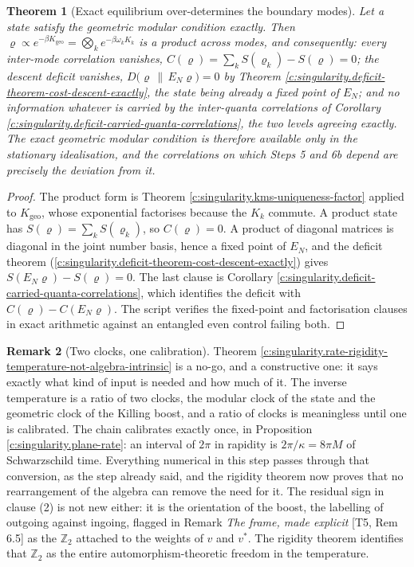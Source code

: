 \documentclass[11pt]{article}
\newtheorem{theorem}{Theorem}[section]
\theoremstyle{definition}
\newtheorem{remark}[theorem]{Remark}
\theoremstyle{plain}
\providecommand{\EN}{}\renewcommand{\EN}{E_{N}}
\providecommand{\rel}{}\renewcommand{\rel}[2]{D\bigl(#1 \,\|\, #2\bigr)}
\begin{document}
\begin{theorem}[Exact equilibrium over-determines the boundary modes]\label{c:singularity.exact-equilibrium-over-determines-boundary-modes}
Let a state satisfy the geometric modular condition exactly. Then $\varrho \propto e^{-\beta K_{\mathrm{geo}}} = \bigotimes_k e^{-\beta\omega_k K_k}$ is a product across modes, and consequently: every inter-mode correlation vanishes, $C(\varrho) = \sum_k S(\varrho_k) - S(\varrho) = 0$; the descent deficit vanishes, $\rel{\varrho}{\EN\varrho} = 0$ by Theorem \ref{c:singularity.deficit-theorem-cost-descent-exactly}, the state being already a fixed point of $\EN$; and no information whatever is carried by the inter-quanta correlations of Corollary \ref{c:singularity.deficit-carried-quanta-correlations}, the two levels agreeing exactly. The exact geometric modular condition is therefore available only in the stationary idealisation, and the correlations on which Steps 5 and 6b depend are precisely the deviation from it.
\end{theorem}
\begin{proof}
The product form is Theorem \ref{c:singularity.kms-uniqueness-factor} applied to $K_{\mathrm{geo}}$, whose exponential factorises because the $K_k$ commute. A product state has $S(\varrho) = \sum_k S(\varrho_k)$, so $C(\varrho) = 0$. A product of diagonal matrices is diagonal in the joint number basis, hence a fixed point of $\EN$, and the deficit theorem (\ref{c:singularity.deficit-theorem-cost-descent-exactly}) gives $S(\EN\varrho) - S(\varrho) = 0$. The last clause is Corollary \ref{c:singularity.deficit-carried-quanta-correlations}, which identifies the deficit with $C(\varrho) - C(\EN\varrho)$. The script verifies the fixed-point and factorisation clauses in exact arithmetic against an entangled even control failing both.

\end{proof}

\begin{remark}[Two clocks, one calibration]\label{c:note.singularity.two-clocks-one-calibration}
Theorem \ref{c:singularity.rate-rigidity-temperature-not-algebra-intrinsic} is a no-go, and a constructive one: it says exactly what kind of input is needed and how much of it. The inverse temperature is a ratio of two clocks, the modular clock of the state and the geometric clock of the Killing boost, and a ratio of clocks is meaningless until one is calibrated. The chain calibrates exactly once, in Proposition \ref{c:singularity.plane-rate}: an interval of $2\pi$ in rapidity is $2\pi/\kappa = 8\pi M$ of Schwarzschild time. Everything numerical in this step passes through that conversion, as the step already said, and the rigidity theorem now proves that no rearrangement of the algebra can remove the need for it. The residual sign in clause (2) is not new either: it is the orientation of the boost, the labelling of outgoing against ingoing, flagged in Remark \emph{The frame, made explicit} [T5, Rem 6.5] as the $\mathbb{Z}_2$ attached to the weights of $v$ and $v^{*}$. The rigidity theorem identifies that $\mathbb{Z}_2$ as the entire automorphism-theoretic freedom in the temperature.
\end{remark}
\end{document}

